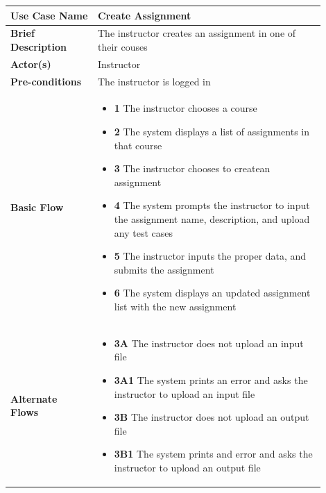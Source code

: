 \documentclass{article}
\begin{document}
\begin{tabular}{| p{0.25\linewidth} | p{0.65\linewidth} |}
  \hline
  \textbf{Use Case Name} & Create Assignment \\
  \hline
  \textbf{Brief Description} & The instructor creates an assignment in one of their couses \\
  \hline
  \textbf{Actor(s)} & Instructor \\
  \hline
  \textbf{Pre-conditions} & The instructor is logged in\\
  \hline
  \textbf{Basic Flow} & \begin{itemize}
    \item[] \textbf{1} The instructor chooses a course
    \item[] \textbf{2} The system displays a list of assignments in that course
    \item[] \textbf{3} The instructor chooses to createan assignment
    \item[] \textbf{4} The system prompts the instructor to input the assignment name, description, and upload any test cases
    \item[] \textbf{5} The instructor inputs the proper data, and submits the assignment
    \item[] \textbf{6} The system displays an updated assignment list with the new assignment
  \end{itemize}\\
  \hline
  \textbf{Alternate Flows} & \begin{itemize}
    \item[] \textbf{3A} The instructor does not upload an input file
    \item[] \textbf{3A1} The system prints an error and asks the instructor to upload an input file
    \item[] \textbf{3B} The instructor does not upload an output file
    \item[] \textbf{3B1} The system prints and error and asks the instructor to upload an output file
  \end{itemize} \\
  \hline
\end{tabular}

\vspace{0.2in}
\end{document}

